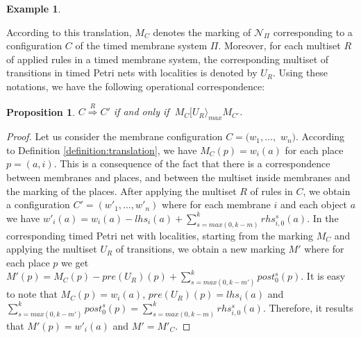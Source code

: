\documentclass{eptcs}
\newtheorem{proposition}{Proposition}
\newtheorem{example}{Example}
\begin{document}
\begin{example}
\begin{center}
\end{center}
\end{example}
According to this translation, $M_C$ denotes the marking
of $\mathcal{N}_\Pi$ corresponding to a configuration $C$ of the
timed membrane system $\Pi$. Moreover, for each multiset $R$ of
applied rules in a timed membrane system, the corresponding multiset
of transitions in timed Petri nets with localities is denoted by
$U_R$. Using these notations, we have the following operational correspondence:

\begin{proposition}\label{proposition:corresp}
$C \stackrel{R}{\Longrightarrow} C'$ if and only if $~M_C[U_R\rangle_{max} M_{C'}$.
\end{proposition}
\begin{proof}[Proof] Let us consider the membrane
configuration $C=(w_1,\ldots,$ $w_n)$. According to Definition
\ref{definition:translation}, we have $M_C(p)=w_i(a)$ for each place
$p=(a,i)$. This is a consequence of the fact that there is a
correspondence between membranes and places, and between the
multiset inside membranes and the marking of the places.
After applying the multiset $R$ of rules in
$C$, we obtain a configuration $C'=(w'_1,\ldots,w'_n)$ where for each
membrane $i$ and each object $a$ we have
$w'_i(a)=w_i(a)-lhs_i(a)+\sum^{k}_{s=max(0,k-m)} rhs^s_{i,0}(a)$. In
the corresponding timed Petri net with localities, starting from the
marking $M_C$ and applying the multiset $U_R$ of transitions, we
obtain a new marking $M'$ where for each place $p$ we get
$M'(p)=M_{C}(p)-pre(U_R)(p)+\sum^k_{s=max(0,k-m')}post^s_{0}(p)$. It
is easy to note that $M_C(p)=w_i(a)$, $pre(U_R)(p)=lhs_i(a)$ and\\
$\sum^k_{s=max(0,k-m')}post^s_{0}(p)=\sum^{k}_{s=max(0,k-m)}
rhs^s_{i,0}(a)$. Therefore, it results that $M'(p)\!=\!w'_i(a)$ and
$M'=M'_C$.
\end{proof}
\end{document}
